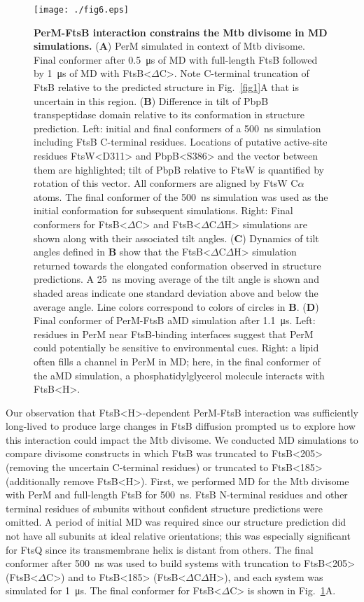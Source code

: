 \documentclass[pdflatex,sn-nature]{sn-jnl}%
\def\textsuperscript#1{<#1>}%
\newcommand\mtb{Mtb}
\newcommand\ftsbH{FtsB\textsuperscript{H}}
\newcommand\ftsbdCdH{FtsB\textsuperscript{$\Delta{}$C$\Delta{}$H}}
\newcommand\ftsbdC{FtsB\textsuperscript{$\Delta{}$C}}
\begin{document}
\begin{figure}[b]
    \centering
    \texttt{[image: ./fig6.eps]}
    \caption{
        \textbf{PerM-FtsB interaction constrains the \mtb{} divisome in MD simulations.}
        (\textbf{A}) PerM simulated in context of \mtb{} divisome. Final conformer after \qty{0.5}{\us} of MD with full-length FtsB followed by \qty{1}{\us} of MD with \ftsbdC{}. Note C-terminal truncation of FtsB relative to the predicted structure in Fig.~\ref{fig1}A that is uncertain in this region.
        (\textbf{B}) Difference in tilt of PbpB transpeptidase domain relative to its conformation in structure prediction.
        Left: initial and final conformers of a \qty{500}{\ns} simulation including FtsB C-terminal residues.
        Locations of putative active-site residues FtsW\textsuperscript{D311} and PbpB\textsuperscript{S386} and the vector between them are highlighted; tilt of PbpB relative to FtsW is quantified by rotation of this vector.
        All conformers are aligned by FtsW C$\alpha$ atoms.
        The final conformer of the \qty{500}{\ns} simulation was used as the initial conformation for subsequent simulations.
        Right: Final conformers for \ftsbdC{} and \ftsbdCdH{} simulations are shown along with their associated tilt angles.
        (\textbf{C}) Dynamics of tilt angles defined in \textbf{B} show that the \ftsbdCdH{} simulation returned towards the elongated conformation observed in structure predictions.
        A \qty{25}{\ns} moving average of the tilt angle is shown and shaded areas indicate one standard deviation above and below the average angle.
        Line colors correspond to colors of circles in \textbf{B}.
        (\textbf{D}) Final conformer of PerM-FtsB aMD simulation after \qty{1.1}{\us}. Left: residues in PerM near FtsB-binding interfaces suggest that PerM could potentially be sensitive to environmental cues. Right: a lipid often fills a channel in PerM in MD; here, in the final conformer of the aMD simulation, a phosphatidylglycerol molecule interacts with \ftsbH{}.
    }\label{fig6}
\end{figure}

Our observation that \ftsbH{}-dependent PerM-FtsB interaction was sufficiently long-lived to produce large changes in FtsB diffusion prompted us to explore how this interaction could impact the \mtb{} divisome.
We conducted MD simulations to compare divisome constructs in which FtsB was truncated to FtsB\textsuperscript{205} (removing the uncertain C-terminal residues) or truncated to FtsB\textsuperscript{185} (additionally remove \ftsbH{}).
First, we performed MD for the \mtb{} divisome with PerM and full-length FtsB for \qty{500}{\ns}. FtsB N-terminal residues and other terminal residues of subunits without confident structure predictions were omitted.
A period of initial MD was required since our structure prediction did not have all subunits at ideal relative orientations; this was especially significant for FtsQ since its transmembrane helix is distant from others.
The final conformer after \qty{500}{\ns} was used to build systems with truncation to FtsB\textsuperscript{205} (\ftsbdC{}) and to FtsB\textsuperscript{185} (\ftsbdCdH{}), and each system was simulated for \qty{1}{\us}.
The final conformer for \ftsbdC{} is shown in Fig.~\ref{fig6}A.
\end{document}
